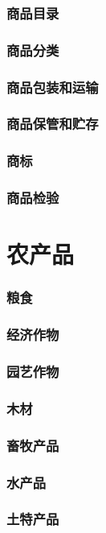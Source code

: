 \documentclass[UTF8]{../../RepresentationUniverse}
\begin{document}
    \subsubsection{商品目录}
    \subsubsection{商品分类}
    \subsubsection{商品包装和运输}
    \subsubsection{商品保管和贮存}
    \subsubsection{商标}
    \subsubsection{商品检验}
\section{农产品}
    \subsubsection{粮食}
    \subsubsection{经济作物}
    \subsubsection{园艺作物}
    \subsubsection{木材}
    \subsubsection{畜牧产品}
    \subsubsection{水产品}
    \subsubsection{土特产品}
\end{document}

